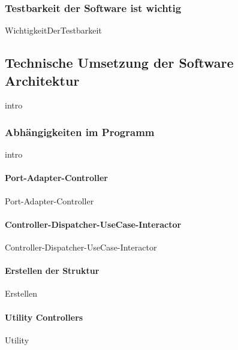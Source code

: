 \documentclass{article}
\begin{document}
        \subsubsection{Testbarkeit der Software ist wichtig}
            {WichtigkeitDerTestbarkeit}
   
    \newpage
    \subsection{Technische Umsetzung der Software Architektur}
    \label{kap:commonArchitectureDescription}
        {intro}

        \newpage
        \subsubsection{Abhängigkeiten im Programm}
        \label{kap:Structur}
            {intro}
            \label{kap:StrukturIntro}

            \paragraph{Port-Adapter-Controller}
            \label{Port-Adapter-Controller}
                {Port-Adapter-Controller}

            \paragraph{Controller-Dispatcher-UseCase-Interactor} 
            \label{Controller-Dispatcher-UseCase-Interactor}
                {Controller-Dispatcher-UseCase-Interactor}
    
            \newpage
            \paragraph{Erstellen der Struktur}
                {Erstellen}
   
            \paragraph{Utility Controllers}
            \label{kap:utilityControllers}
                {Utility}
   
\end{document}
